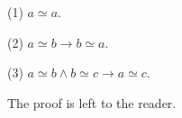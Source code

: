 (1) $a \simeq a$.

(2) $a \simeq b \rightarrow b \simeq a$.

(3) $a \simeq b \wedge b \simeq c \rightarrow a \simeq c$.

The proof is left to the reader.
